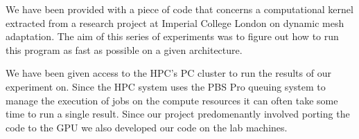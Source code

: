 We have been provided with a piece of code that concerns a computational kernel extracted from a research project at Imperial College London on dynamic mesh adaptation\cite{pragmatic}.
The aim of this series of experiments was to figure out how to run this program as fast as possible on a given architecture.

We have been given access to the HPC's PC cluster to run the results of our experiment on.
Since the HPC system uses the PBS Pro queuing system to manage the execution of jobs on the compute resources it can often take some time to run a single result.
Since our project predomenantly involved porting the code to the GPU we also developed our code on the lab machines.